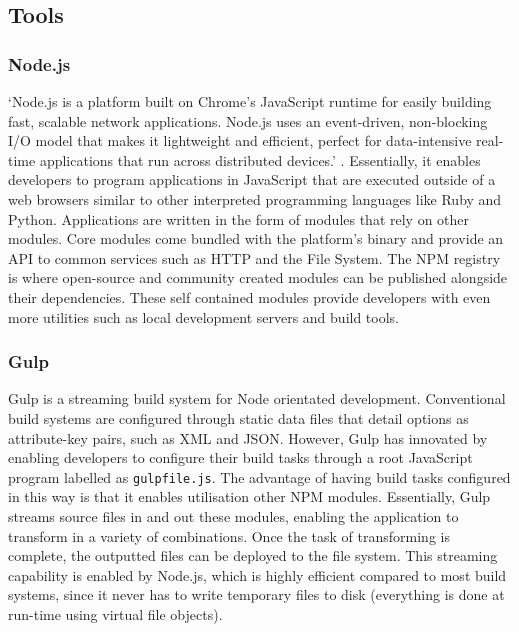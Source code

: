 \documentclass[final]{cmpreport}
\begin{document}

\subsection{Tools}

\subsubsection{Node.js}
`Node.js is a platform built on Chrome's JavaScript runtime for easily building fast, scalable network applications. Node.js uses an event-driven, non-blocking I/O model that makes it lightweight and efficient, perfect for data-intensive real-time applications that run across distributed devices.' \footnotemark . Essentially, it enables developers to program applications in JavaScript that are executed outside of a web browsers similar to other interpreted programming languages like Ruby and Python. Applications are written in the form of modules that rely on other modules. Core modules come bundled with the platform's binary and provide an API to common services such as HTTP and the File System. The NPM registry is where open-source and community created modules can be published alongside their dependencies. These self contained modules provide developers with even more utilities such as local development servers and build tools.


\subsubsection{Gulp}
Gulp \footnotemark is a streaming build system for Node orientated development. Conventional build systems are configured through static data files that detail options as attribute-key pairs, such as XML and JSON. However, Gulp has innovated by enabling developers to configure their build tasks through a root JavaScript program labelled as \texttt{gulpfile.js}. The advantage of having build tasks configured in this way is that it enables utilisation other NPM modules. Essentially, Gulp streams source files in and out these modules, enabling the application to transform in a variety of combinations. Once the task of transforming is complete, the outputted files can be deployed to the file system. This streaming capability is enabled by Node.js, which is highly efficient compared to most build systems, since it never has to write temporary files to disk (everything is done at run-time using virtual file objects).
\end{document}
